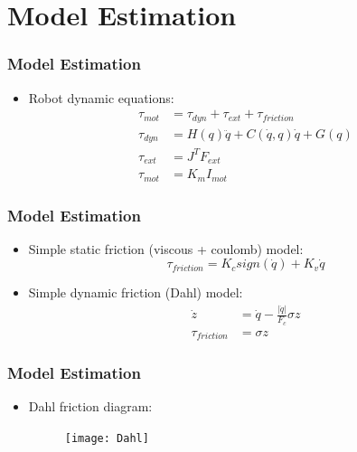 \documentclass[12pt,english]{beamer}
\begin{document}
  \section{Model Estimation}
  \begin{frame}
    \frametitle{Model Estimation}
    \begin{itemize}
      \item Robot dynamic equations:
      \begin{align}
        \tau_{mot} &= \tau_{dyn} + \tau_{ext} + \tau_{friction}\\
        \tau_{dyn} &= H\left(q\right)\ddot{q} + C\left(\dot{q} , q \right)\dot{q} + G\left(q \right)\\
        \tau_{ext} &= J^{T} F_{ext}\\
        \tau_{mot} &= K_{m} I_{mot}
      \end{align}
    \end{itemize}
  \end{frame}
  
  \begin{frame}
    \frametitle{Model Estimation}
    \begin{itemize}
      \item Simple static friction (viscous + coulomb) model:
      \begin{equation}
        \tau_{friction} = K_{c} sign\left(\dot{q}\right) + K_{v} \dot{q}
      \end{equation}
      \item Simple dynamic friction (Dahl) model:
      \begin{align}
        \dot{z} &= \dot{q} - \frac{\left|\dot{q}\right|}{F_{c}} \sigma z \\
        \tau_{friction} &= \sigma z
      \end{align}
    \end{itemize}
  \end{frame}
  
  \begin{frame}
    \frametitle{Model Estimation}
    \begin{itemize}
      \item Dahl friction diagram:
      \begin{figure}
        \texttt{[image: Dahl]} \,
      \end{figure}
    \end{itemize}
  \end{frame}
  
\end{document}
